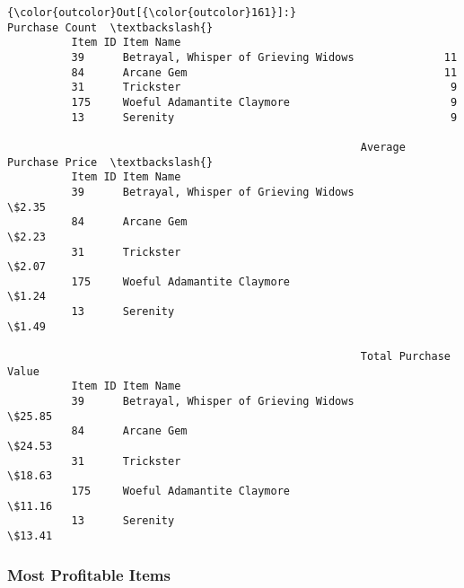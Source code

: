 \documentclass[11pt]{article}
\begin{document}
\begin{Verbatim}[commandchars=\\\{\}]
{\color{outcolor}Out[{\color{outcolor}161}]:}                                               Purchase Count  \textbackslash{}
          Item ID Item Name                                              
          39      Betrayal, Whisper of Grieving Widows              11   
          84      Arcane Gem                                        11   
          31      Trickster                                          9   
          175     Woeful Adamantite Claymore                         9   
          13      Serenity                                           9   
          
                                                       Average Purchase Price  \textbackslash{}
          Item ID Item Name                                                     
          39      Betrayal, Whisper of Grieving Widows                  \$2.35   
          84      Arcane Gem                                            \$2.23   
          31      Trickster                                             \$2.07   
          175     Woeful Adamantite Claymore                            \$1.24   
          13      Serenity                                              \$1.49   
          
                                                       Total Purchase Value  
          Item ID Item Name                                                  
          39      Betrayal, Whisper of Grieving Widows               \$25.85  
          84      Arcane Gem                                         \$24.53  
          31      Trickster                                          \$18.63  
          175     Woeful Adamantite Claymore                         \$11.16  
          13      Serenity                                           \$13.41  
\end{Verbatim}
            
    \subsubsection{Most Profitable Items}\label{most-profitable-items}
\end{document}
